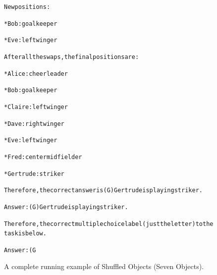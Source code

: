 \begin{figure}[t]
{{\begin{alltt}
New positions:

* Bob: goalkeeper

* Eve: left winger

After all the swaps, the final positions are:

* Alice: cheerleader

* Bob: goalkeeper

* Claire: left winger

* Dave: right winger

* Eve: left winger

* Fred: center midfielder

* Gertrude: striker

Therefore, the correct answer is (G) Gertrude is playing striker.

Answer: (G) Gertrude is playing striker.

Therefore, the correct multiple choice label (just the letter) to the task is below.

Answer: (G
\end{alltt}
}}
\caption{A complete running example of Shuffled Objects (Seven Objects).}
\label{fig:shuffled_objects=seven_objects_example}
\end{figure}
